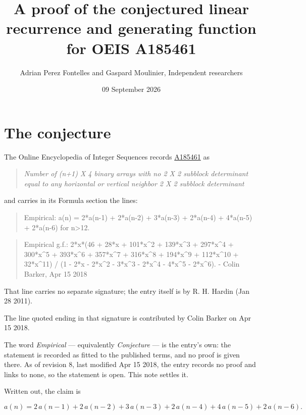 \documentclass[11pt]{article}
\title{A proof of the conjectured linear recurrence and generating function for OEIS A185461}
\author{Adrian Perez Fontelles and Gaspard Moulinier, Independent researchers}
\date{09 September 2026}
\theoremstyle{definition}
\begin{document}
\maketitle
\section{The conjecture}

The Online Encyclopedia of Integer Sequences records \href{https://oeis.org/A185461}{A185461} as

\begin{quote}\itshape Number of (n+1) X 4 binary arrays with no 2 X 2 subblock determinant equal to any horizontal or vertical neighbor 2 X 2 subblock determinant\end{quote}

and carries in its Formula section the lines:

\begin{quote}\ttfamily Empirical: a(n) = 2*a(n-1) + 2*a(n-2) + 3*a(n-3) + 2*a(n-4) + 4*a(n-5) + 2*a(n-6) for n>12.\end{quote}

\begin{quote}\ttfamily Empirical g.f.: 2*x*(46 + 28*x + 101*x\textasciicircum{}2 + 139*x\textasciicircum{}3 + 297*x\textasciicircum{}4 + 300*x\textasciicircum{}5 + 393*x\textasciicircum{}6 + 357*x\textasciicircum{}7 + 316*x\textasciicircum{}8 + 194*x\textasciicircum{}9 + 112*x\textasciicircum{}10 + 32*x\textasciicircum{}11) / (1 - 2*x - 2*x\textasciicircum{}2 - 3*x\textasciicircum{}3 - 2*x\textasciicircum{}4 - 4*x\textasciicircum{}5 - 2*x\textasciicircum{}6). - Colin Barker, Apr 15 2018\end{quote}

That line carries no separate signature; the entry itself is by R. H. Hardin (Jan 28 2011).

The line quoted ending in that signature is contributed by Colin Barker on Apr 15 2018.

The word {\itshape Empirical} --- equivalently {\itshape Conjecture} --- is the entry's own: the statement is recorded as fitted to the published terms, and no proof is given there. As of revision 8, last modified Apr 15 2018, the entry records no proof and links to none, so the statement is open. This note settles it.

Written out, the claim is

\[a(n) = 2\,a(n-1) + 2\,a(n-2) + 3\,a(n-3) + 2\,a(n-4) + 4\,a(n-5) + 2\,a(n-6).\]
\end{document}
